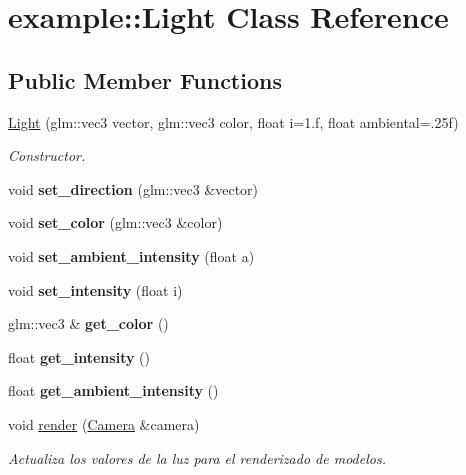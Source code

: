 \hypertarget{classexample_1_1_light}{}\section{example\+::Light Class Reference}
\label{classexample_1_1_light}
\subsection*{Public Member Functions}
\begin{DoxyCompactItemize}
\item 
\mbox{\hyperlink{classexample_1_1_light_aa6f37f679df3d5f700a69fd67372b98c}{Light}} (glm\+::vec3 vector, glm\+::vec3 color, float i=1.f, float ambiental=.\+25f)
\begin{DoxyCompactList}\small\item\em Constructor. \end{DoxyCompactList}\item 
\mbox{\label{classexample_1_1_light_afc441dd6773289524261966564694e5e}} 
void {\bfseries set\+\_\+direction} (glm\+::vec3 \&vector)
\item 
\mbox{\label{classexample_1_1_light_a4df268e4e7a15da64f9bd87dc287d497}} 
void {\bfseries set\+\_\+color} (glm\+::vec3 \&color)
\item 
\mbox{\label{classexample_1_1_light_ad4e5e71a9df1a21c2f871ca0b6fabd25}} 
void {\bfseries set\+\_\+ambient\+\_\+intensity} (float a)
\item 
\mbox{\label{classexample_1_1_light_abdbdc7a21b210982ba38d31578be906c}} 
void {\bfseries set\+\_\+intensity} (float i)
\item 
\mbox{\label{classexample_1_1_light_ac33fd29b91c592a98c5547b2c9a2ef7b}} 
glm\+::vec3 \& {\bfseries get\+\_\+color} ()
\item 
\mbox{\label{classexample_1_1_light_ab6381a1d078b52844da0098f059633e1}} 
float {\bfseries get\+\_\+intensity} ()
\item 
\mbox{\label{classexample_1_1_light_ac7944c96c9977aa663dc29fa28bdbe6d}} 
float {\bfseries get\+\_\+ambient\+\_\+intensity} ()
\item 
void \mbox{\hyperlink{classexample_1_1_light_a997d9866ab2e690bb7fb1988a55da627}{render}} (\mbox{\hyperlink{classexample_1_1_camera}{Camera}} \&camera)
\begin{DoxyCompactList}\small\item\em Actualiza los valores de la luz para el renderizado de modelos. \end{DoxyCompactList}\end{DoxyCompactItemize}

